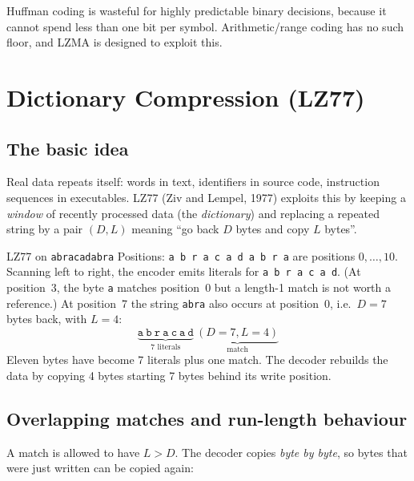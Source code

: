 \documentclass[11pt,a4paper,oneside]{book}
\begin{document}
\begin{keyidea}
Huffman coding is wasteful for highly predictable binary decisions, because it cannot spend less than one bit per symbol.
Arithmetic/range coding has no such floor, and LZMA is designed to exploit this.
\end{keyidea}

\chapter{Dictionary Compression (LZ77)}

\section{The basic idea}

Real data repeats itself: words in text, identifiers in source code, instruction sequences in executables.
LZ77 (Ziv and Lempel, 1977) exploits this by keeping a \emph{window} of recently processed data (the
\emph{dictionary}) and replacing a repeated string by a pair $(D, L)$ meaning ``go back $D$ bytes and copy $L$ bytes''.

\begin{workedex}{LZ77 on \texttt{abracadabra}}
Positions: \texttt{a b r a c a d a b r a} are positions $0,\dots,10$.
Scanning left to right, the encoder emits literals for \texttt{a b r a c a d}. (At position~3, the byte
\texttt{a} matches position~0 but a length-1 match is not worth a reference.) At position~7 the string
\texttt{abra} also occurs at position~0, i.e.\ $D=7$ bytes back, with $L=4$:
\[
\underbrace{\texttt{a}\ \texttt{b}\ \texttt{r}\ \texttt{a}\ \texttt{c}\ \texttt{a}\ \texttt{d}}_{\text{7 literals}}\
\underbrace{(D{=}7,L{=}4)}_{\text{match}}
\]
Eleven bytes have become 7 literals plus one match. The decoder rebuilds the data by copying 4 bytes starting 7 bytes behind its write position.
\end{workedex}

\section{Overlapping matches and run-length behaviour}

A match is allowed to have $L>D$. The decoder copies \emph{byte by byte}, so bytes that were just written can be
copied again:
\end{document}
